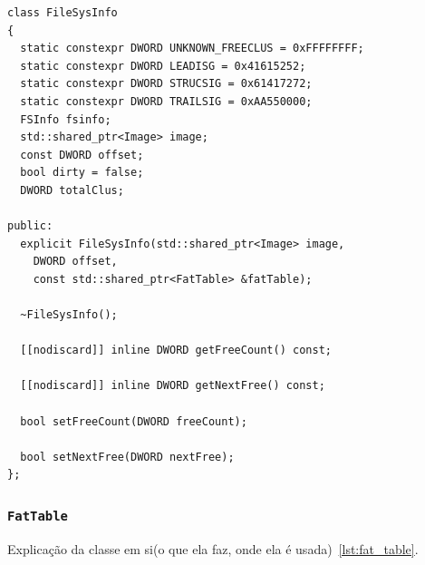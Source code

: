 \documentclass[
    12pt,				%
    oneside,   	        %
    a4paper,			%
    english,			%
    french,				%
    spanish,			%
    brazil,				%
    ]{pacotes/abntex2}
\begin{document}
\begin{lstlisting}[caption={Classe que abstrai a extração de informações da estrutura FSInfo}, label={lst:fileinfo}]
class FileSysInfo
{
  static constexpr DWORD UNKNOWN_FREECLUS = 0xFFFFFFFF;
  static constexpr DWORD LEADISG = 0x41615252;
  static constexpr DWORD STRUCSIG = 0x61417272;
  static constexpr DWORD TRAILSIG = 0xAA550000;
  FSInfo fsinfo;
  std::shared_ptr<Image> image;
  const DWORD offset;
  bool dirty = false;
  DWORD totalClus;

public:
  explicit FileSysInfo(std::shared_ptr<Image> image,
    DWORD offset,
    const std::shared_ptr<FatTable> &fatTable);

  ~FileSysInfo();
  
  [[nodiscard]] inline DWORD getFreeCount() const;

  [[nodiscard]] inline DWORD getNextFree() const;

  bool setFreeCount(DWORD freeCount);

  bool setNextFree(DWORD nextFree);
};
\end{lstlisting}

\subsubsection{\texttt{FatTable}}
\label{subsubsec:fat_table}

Explicação da classe em si(o que ela faz, onde ela é usada)~\ref{lst:fat_table}.
\end{document}
